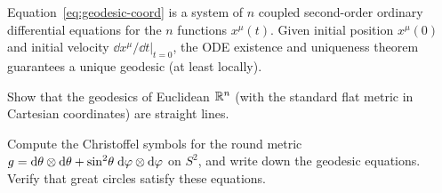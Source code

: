 \begin{remark}
  Equation~\eqref{eq:geodesic-coord} is a system of $n$
  coupled second-order ordinary differential equations for the
  $n$ functions $x^\mu(t)$.  Given initial position
  $x^\mu(0)$ and initial velocity
  $\dd x^\mu/\dd t|_{t=0}$, the ODE existence and uniqueness
  theorem guarantees a unique geodesic (at least locally).
\end{remark}

\begin{exercise}\label{ex:geodesic-flat}
  Show that the geodesics of Euclidean $\mathbb{R}^{n}$ (with the
  standard flat metric in Cartesian coordinates) are straight
  lines.
\end{exercise}

\begin{exercise}\label{ex:geodesic-sphere}
  Compute the Christoffel symbols for the round metric
  $g = \mathrm{d}\theta\otimes\mathrm{d}\theta
    + \sin^2\!\theta\;\mathrm{d}\varphi\otimes\mathrm{d}\varphi$
  on $S^2$, and write down the geodesic equations.
  Verify that great circles satisfy these equations.
\end{exercise}
